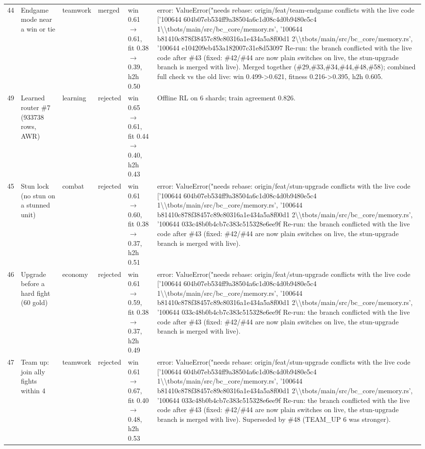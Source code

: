\begin{xltabular}{\linewidth}{@{}rp{3.2cm}lp{1.3cm}p{4.3cm}X@{}}
44 & Endgame mode near a win or tie & teamwork & merged & win 0.61$\to$0.61, fit 0.38$\to$0.39, h2h 0.50 & error: ValueError("needs rebase: origin/feat/team-endgame conflicts with the live code ['100644 604b07eb534ff9a38504a6c1d08c4d0b9480e5c4 1\textbackslash{}\textbackslash{}tbots/main/src/bc\_core/memory.rs', '100644 b81410c878f38457c89c80316a1e434a5a8f00d1 2\textbackslash{}\textbackslash{}tbots/main/src/bc\_core/memory.rs', '100644 e104209eb453a182007c31e8d53097 Re-run: the branch conflicted with the live code after \#43 (fixed: \#42/\#44 are now plain switches on live, the stun-upgrade branch is merged with live). Merged together (\#29,\#33,\#34,\#44,\#48,\#58); combined full check vs the old live: win 0.499->0.621, fitness 0.216->0.395, h2h 0.605.\\
49 & Learned router \#7 (933738 rows, AWR) & learning & rejected & win 0.65$\to$0.61, fit 0.44$\to$0.40, h2h 0.43 & Offline RL on 6 shards; train agreement 0.826.\\
45 & Stun lock (no stun on a stunned unit) & combat & rejected & win 0.61$\to$0.60, fit 0.38$\to$0.37, h2h 0.51 & error: ValueError("needs rebase: origin/feat/stun-upgrade conflicts with the live code ['100644 604b07eb534ff9a38504a6c1d08c4d0b9480e5c4 1\textbackslash{}\textbackslash{}tbots/main/src/bc\_core/memory.rs', '100644 b81410c878f38457c89c80316a1e434a5a8f00d1 2\textbackslash{}\textbackslash{}tbots/main/src/bc\_core/memory.rs', '100644 033c48b0b4cb7c383c515328e6ee9f Re-run: the branch conflicted with the live code after \#43 (fixed: \#42/\#44 are now plain switches on live, the stun-upgrade branch is merged with live).\\
46 & Upgrade before a hard fight (60 gold) & economy & rejected & win 0.61$\to$0.59, fit 0.38$\to$0.37, h2h 0.49 & error: ValueError("needs rebase: origin/feat/stun-upgrade conflicts with the live code ['100644 604b07eb534ff9a38504a6c1d08c4d0b9480e5c4 1\textbackslash{}\textbackslash{}tbots/main/src/bc\_core/memory.rs', '100644 b81410c878f38457c89c80316a1e434a5a8f00d1 2\textbackslash{}\textbackslash{}tbots/main/src/bc\_core/memory.rs', '100644 033c48b0b4cb7c383c515328e6ee9f Re-run: the branch conflicted with the live code after \#43 (fixed: \#42/\#44 are now plain switches on live, the stun-upgrade branch is merged with live).\\
47 & Team up: join ally fights within 4 & teamwork & rejected & win 0.61$\to$0.67, fit 0.40$\to$0.48, h2h 0.53 & error: ValueError("needs rebase: origin/feat/stun-upgrade conflicts with the live code ['100644 604b07eb534ff9a38504a6c1d08c4d0b9480e5c4 1\textbackslash{}\textbackslash{}tbots/main/src/bc\_core/memory.rs', '100644 b81410c878f38457c89c80316a1e434a5a8f00d1 2\textbackslash{}\textbackslash{}tbots/main/src/bc\_core/memory.rs', '100644 033c48b0b4cb7c383c515328e6ee9f Re-run: the branch conflicted with the live code after \#43 (fixed: \#42/\#44 are now plain switches on live, the stun-upgrade branch is merged with live). Superseded by \#48 (TEAM\_UP 6 was stronger).\\

\end{xltabular}
